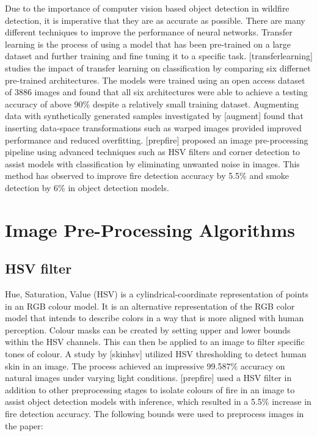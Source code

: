 Due to the importance of computer vision based object detection in
wildfire detection, it is imperative that they are as accurate as
possible. There are many different techniques to improve the performance
of neural networks. Transfer learning is the process of using a model
that has been pre-trained on a large dataset and further training and
fine tuning it to a specific task. {[}transferlearning{]} studies the
impact of transfer learning on classification by comparing six differnet
pre-trained architectures. The models were trained using an open access
dataset of 3886 images and found that all six architectures were able to
achieve a testing accuracy of above 90\% despite a relatively small
training dataset. Augmenting data with synthetically generated samples
investigated by {[}augment{]} found that inserting data-space
transformations such as warped images provided improved performance and
reduced overfitting. {[}prepfire{]} proposed an image pre-processing
pipeline using advanced techniques such as HSV filters and corner
detection to assist models with classification by eliminating unwanted
noise in images. This method has observed to improve fire detection
accuracy by 5.5\% and smoke detection by 6\% in object detection models.

\section{Image Pre-Processing Algorithms}

\subsection{HSV filter}

Hue, Saturation, Value (HSV) is a cylindrical-coordinate representation
of points in an RGB colour model. It is an alternative representation of
the RGB color model that intends to describe colors in a way that is
more aligned with human perception. Colour masks can be created by
setting upper and lower bounds within the HSV channels. This can then be
applied to an image to filter specific tones of colour. A study by
{[}skinhsv{]} utilized HSV thresholding to detect human skin in an
image. The process achieved an impressive 99.587\% accuracy on natural
images under varying light conditions. {[}prepfire{]} used a HSV filter
in addition to other preprocessing stages to isolate colours of fire in
an image to assist object detection models with inference, which
resulted in a 5.5\% increase in fire detection accuracy. The following
bounds were used to preprocess images in the paper:

